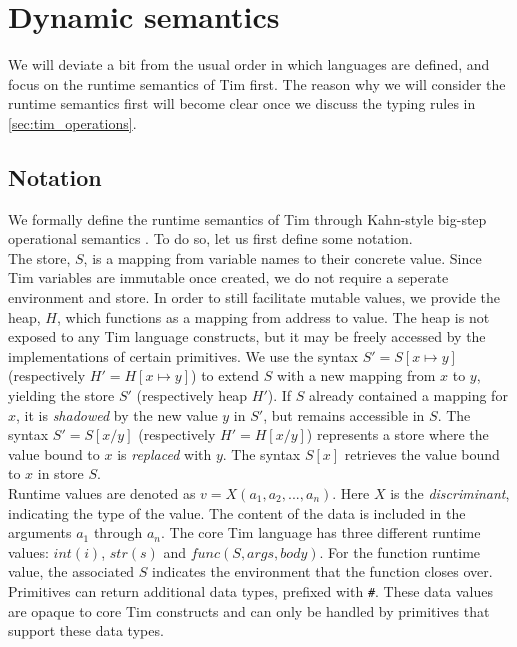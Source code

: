 
\section{Dynamic semantics}
\label{sec:tim_runtime_semantics}
We will deviate a bit from the usual order in which languages are defined, and focus on the runtime semantics of Tim first. The reason why we will consider the runtime semantics first will become clear once we discuss the typing rules in \cref{sec:tim_operations}.\\

\subsection{Notation}
We formally define the runtime semantics of Tim through Kahn-style big-step operational semantics \cite{Kahn87:0}. To do so, let us first define some notation.\\

The store, $S$, is a mapping from variable names to their concrete value. Since Tim variables are immutable once created, we do not require a seperate environment and store. In order to still facilitate mutable values, we provide the heap, $H$, which functions as a mapping from address to value. The heap is not exposed to any Tim language constructs, but it may be freely accessed by the implementations of certain primitives. We use the syntax $S' = S[x \mapsto y]$ (respectively $H' = H[x \mapsto y]$) to extend $S$ with a new mapping from $x$ to $y$, yielding the store $S'$ (respectively heap $H'$). If $ S $ already contained a mapping for $ x $, it is \textit{shadowed} by the new value $ y $ in $ S' $, but remains accessible in $ S $. The syntax $S' = S[x/y]$ (respectively $H' = H[x/y]$) represents a store where the value bound to $ x $ is \textit{replaced} with $ y $. The syntax $ S[x] $ retrieves the value bound to $x$ in store $S$. \\

Runtime values are denoted as $v = X(a_1, a_2, ..., a_n)$. Here $X$ is the \textit{discriminant}, indicating the type of the value. The content of the data is included in the arguments $a_1$ through $a_n$. The core Tim language has three different runtime values: $int(i)$, $str(s)$ and $func(S, args, body)$. For the function runtime value, the associated $S$ indicates the environment that the function closes over. Primitives can return additional data types, prefixed with \texttt{\#}. These data values are opaque to core Tim constructs and can only be handled by primitives that support these data types.\\


